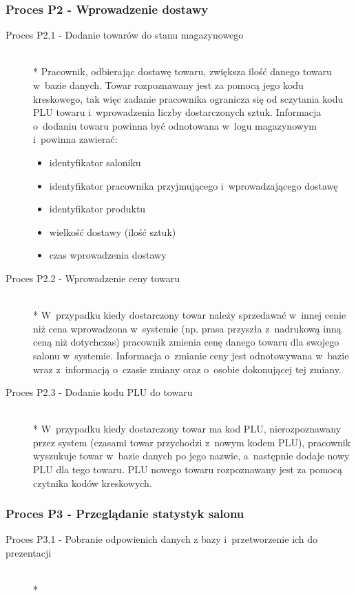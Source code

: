 \subsubsection{Proces P2 - Wprowadzenie dostawy}
\begin{description}
\item[Proces P2.1 - Dodanie towarów do stanu magazynowego] ~\\*
Pracownik, odbierając dostawę towaru, zwiększa ilość danego towaru w~bazie danych. Towar rozpoznawany jest za pomocą jego kodu kreskowego, tak więc zadanie pracownika ogranicza się od sczytania kodu PLU towaru i~wprowadzenia liczby dostarczonych sztuk. Informacja o~dodaniu towaru powinna być odnotowana w~logu magazynowym i~powinna zawierać:
\begin{itemize}
\item identyfikator saloniku
\item identyfikator pracownika przyjmującego i~wprowadzającego dostawę
\item identyfikator produktu
\item wielkość dostawy (ilość sztuk)
\item czas wprowadzenia dostawy
\end{itemize}
\item[Proces P2.2 - Wprowadzenie ceny towaru] ~\\*
W~przypadku kiedy dostarczony towar należy sprzedawać w~innej cenie niż cena wprowadzona w~systemie (np. prasa przyszła z~nadrukową inną ceną niż dotychczas) pracownik zmienia cenę danego towaru dla swojego salonu w~systemie. Informacja o~zmianie ceny jest odnotowywana w~bazie wraz z~informacją o~czasie zmiany oraz o~osobie dokonującej tej zmiany.
\item[Proces P2.3 - Dodanie kodu PLU do towaru] ~\\*
W~przypadku kiedy dostarczony towar ma kod PLU, nierozpoznawany przez system (czasami towar przychodzi z~nowym kodem PLU), pracownik wyszukuje towar w~bazie danych po jego nazwie, a~następnie dodaje nowy PLU dla tego towaru. PLU nowego towaru rozpoznawany jest za pomocą czytnika kodów kreskowych.
\end{description}
\subsubsection{Proces P3 - Przeglądanie statystyk salonu}
\begin{description}
\item[Proces P3.1 - Pobranie odpowienich danych z bazy i~przetworzenie ich do prezentacji] ~\\*
\end{description}
